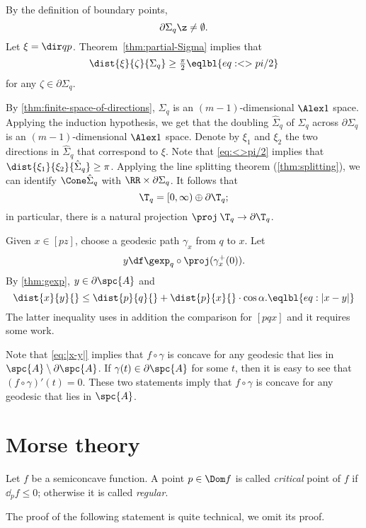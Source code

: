 By the definition of boundary points, 
\[\partial \Sigma_q\z\ne\emptyset.\]
Let $\xi=\dir qp$.
Theorem~\ref{thm:partial-Sigma} implies that 
\[\dist{\xi}{\zeta}{\Sigma_q}\ge \tfrac\pi2
\eqlbl{eq:<>pi/2}\]
for any $\zeta\in\partial\Sigma_q$.

By \ref{thm:finite-space-of-directions}, $\Sigma_q$ is an $(m-1)$-dimensional $\Alex1$ space.
Applying the induction hypothesis, we get that the doubling $\hat\Sigma_q$ of $\Sigma_q$ across $\partial \Sigma_q$ is an $(m-1)$-dimensional $\Alex1$ space.
Denote by $\xi_1$ and $\xi_2$ the two directions in $\hat\Sigma_q$ that correspond to $\xi$.
Note that \ref{eq:<>pi/2} implies that $\dist{\xi_1}{\xi_2}{\hat\Sigma_q}\ge \pi$.
Applying the line splitting theorem (\ref{thm:splitting}), we can identify 
$\Cone\hat\Sigma_q$ with $\RR\times \partial\Sigma_q$.
It follows that 
\[\T_q=[0,\infty)\oplus \partial\T_q;\]
in particular, there is a natural projection $\proj\:\T_q\to \partial\T_q$.

Given $x\in [pz]$, choose a geodesic path $\gamma_x$ from $q$ to $x$.
Let 
\[y
\df
\gexp_q\circ\proj(\gamma^+_x(0)).\]
By \ref{thm:gexp}, $y\in \partial\spc{A}$ and 
\[\dist{x}{y}{}\le \dist{p}{q}{}+\dist{p}{x}{}\cdot \cos\alpha.\eqlbl{eq:|x-y|}\]
The latter inequality uses in addition the comparison for $[pqx]$ and it requires some work.

Note that \ref{eq:|x-y|} implies that $f\circ\gamma$ is concave for any geodesic that lies in $\spc{A}\setminus \partial \spc{A}$.
If $\gamma(t)\in \partial \spc{A}$ for some $t$, then it is easy to see that $(f\circ\gamma)'(t)=0$.
These two statements imply that $f\circ\gamma$ is concave for any geodesic that lies in $\spc{A}$.
















\section{Morse theory}

Let $f$ be a semiconcave function.
A point $p\in \Dom f$ is called \emph{critical} point of $f$ if $\dd_pf\le 0$; 
otherwise it is called \emph{regular}.

The proof of the following statement is quite technical, we omit its proof.

